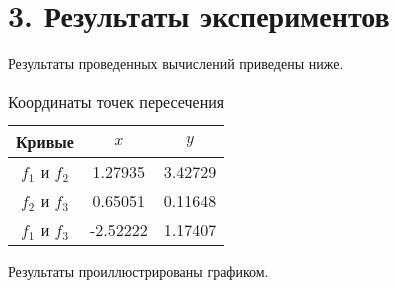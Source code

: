 \documentclass[a4paper,12pt,titlepage,finall]{article}
\begin{document}
\newpage
\section{3. Результаты экспериментов}
Результаты проведенных вычислений приведены ниже.

\begin{table}[h]
\centering
\begin{tabular}{c c c}
\hline
Кривые & $x$ & $y$ \\
\hline
$f_{1}$ и $f_{2}$ &  1.27935 & 3.42729 \\
$f_{2}$ и $f_{3}$ &  0.65051 & 0.11648\\
$f_{1}$ и $f_{3}$ & -2.52222 & 1.17407\\
\hline 
\end{tabular}
\caption{Координаты точек пересечения}
\label{table1}
\end{table}

Результаты проиллюстрированы графиком.
\end{document}

